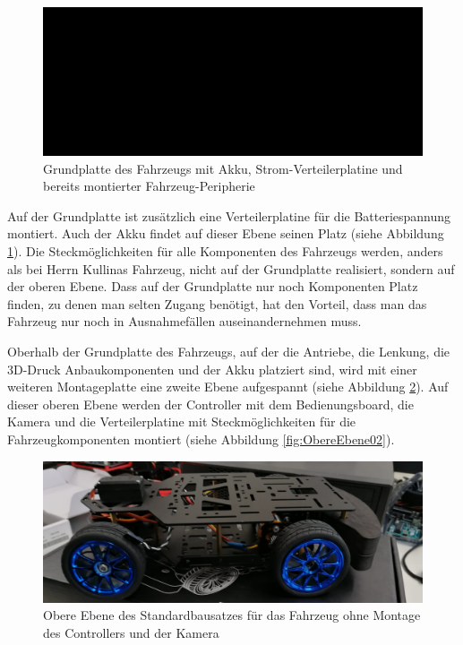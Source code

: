 \begin{figure}[H] %
\includegraphics[width=.90\textwidth]{sec2/images/Grundaufbau/Grundplatte02} 
\centering
\captionsetup{width=.95\textwidth}
\caption[Grundplatte des Fahrzeugs]{Grundplatte des Fahrzeugs mit Akku, Strom-Verteilerplatine und bereits montierter Fahrzeug-Peripherie}\centering
\label{fig:Grundplatte02}
\end{figure}

Auf der Grundplatte ist zusätzlich eine Verteilerplatine für die Batteriespannung montiert. Auch der Akku findet auf dieser Ebene seinen Platz (siehe Abbildung \ref{fig:Grundplatte02}). Die Steckmöglichkeiten für alle Komponenten des Fahrzeugs werden, anders als bei Herrn Kullinas Fahrzeug, nicht auf der Grundplatte realisiert, sondern auf der oberen Ebene. Dass auf der Grundplatte nur noch Komponenten Platz finden, zu denen man selten Zugang benötigt, hat den Vorteil, dass man das Fahrzeug nur noch in Ausnahmefällen auseinandernehmen muss.\vspace{11pt}

Oberhalb der Grundplatte des Fahrzeugs, auf der die Antriebe, die Lenkung, die 3D-Druck Anbaukomponenten und der Akku platziert sind, wird mit einer weiteren Montageplatte eine zweite Ebene aufgespannt (siehe Abbildung \ref{fig:ObereEbene01}). Auf dieser oberen Ebene werden der Controller mit dem Bedienungsboard, die Kamera und die Verteilerplatine mit Steckmöglichkeiten für die Fahrzeugkomponenten montiert (siehe Abbildung \ref{fig:ObereEbene02}).

\begin{figure}[H] %
\includegraphics[width=.86\textwidth]{sec2/images/Grundaufbau/ObereEbene01} 
\centering
\captionsetup{width=.92\textwidth}
\caption[Obere Ebene des Standardbausatzes für das Fahrzeug]{Obere Ebene des Standardbausatzes für das Fahrzeug ohne Montage des Controllers und der Kamera}\centering
\label{fig:ObereEbene01}
\end{figure}

